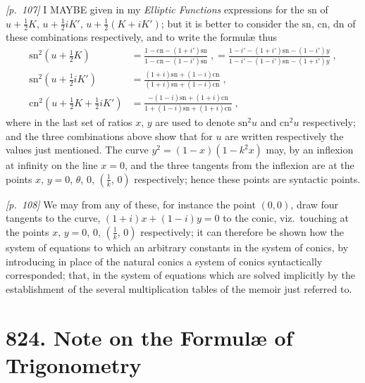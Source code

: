 \documentclass[11pt,a4paper]{article}
\theoremstyle{plain}
\theoremstyle{definition}
\theoremstyle{remark}
\begin{document}
\noindent\textit{[p.~107]} I MAYBE given in my \textit{Elliptic Functions} expressions for the $\mathrm{sn}$ of $u + \frac{1}{2}K$, $u + \frac{1}{2}iK'$, $u + \frac{1}{2}(K + iK')$; but it is better to consider the $\mathrm{sn}$, $\mathrm{cn}$, $\mathrm{dn}$ of these combinations respectively, and to write the formul\ae{} thus
\begin{align*}
\mathrm{sn}^2(u + \tfrac{1}{2}K) &= \frac{1 - \mathrm{cn} - (1 + i')\mathrm{sn}}{1 - \mathrm{cn} - (1 - i')\mathrm{sn}}\;, = \frac{1 - i' - (1 + i')\mathrm{sn} - (1 - i')y}{1 - i' - (1 - i')\mathrm{sn} - (1 + i')y}\;,\\
\mathrm{sn}^2(u + \tfrac{1}{2}iK') &= \frac{(1 + i)\mathrm{sn} + (1 - i)\mathrm{cn}}{(1 + i)\mathrm{sn} + (1 - i)\mathrm{cn}}\;,\\
\mathrm{cn}^2(u + \tfrac{1}{2}K + \tfrac{1}{2}iK') &= \frac{- (1 - i)\mathrm{sn} + (1 + i)\mathrm{cn}}{1 + (1 - i)\mathrm{sn} + (1 + i)\mathrm{cn}}\;,
\end{align*}
where in the last set of ratios $x$, $y$ are used to denote $\mathrm{sn}^2 u$ and $\mathrm{cn}^2 u$ respectively; and the three combinations above show that for $u$ are written respectively the values just mentioned. The curve $y^2 = (1 - x)(1 - k^2x)$ may, by an inflexion at infinity on the line $x = 0$, and the three tangents from the inflexion are at the points $x$, $y = 0$, $\theta$, $0$, $(\tfrac{1}{k},\,0)$ respectively; hence these points are syntactic points.

\bigskip\noindent\textit{[p.~108]} We may from any of these, for instance the point $(0, 0)$, draw four tangents to the curve, $(1 + i)x + (1 - i)y = 0$ to the conic, viz.\ touching at the points $x,\,y = 0$, $0$, $(\frac{1}{k},\,0)$ respectively; it can therefore be shown how the system of equations to which an arbitrary constants in the system of conics, by introducing in place of the natural conics a system of conics syntactically corresponded; that, in the system of equations which are solved implicitly by the establishment of the several multiplication tables of the memoir just referred to.

\bigskip

\section*{824. Note on the Formul\ae{} of Trigonometry}
\end{document}
